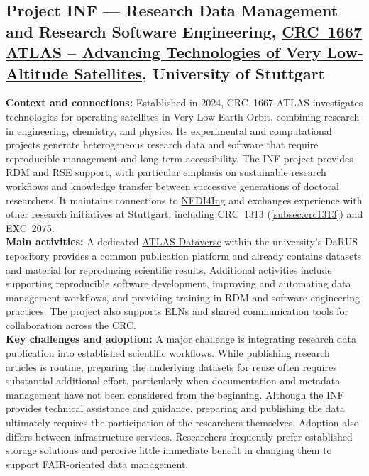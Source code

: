 \documentclass{eceasst}
\begin{document}
\subsection{Project INF --- Research Data Management and Research Software Engineering,
\href{https://gepris.dfg.de/gepris/projekt/516238647?language=en}
{CRC~1667 ATLAS -- Advancing Technologies of Very Low-Altitude Satellites}, University of Stuttgart}
\label{subsec:crc1667}
\noindent\textbf{Context and connections:}
Established in 2024, CRC~1667 ATLAS investigates
technologies for operating satellites in Very Low
Earth Orbit, combining research in engineering,
chemistry, and physics. Its experimental and
computational projects generate heterogeneous
research data and software that require reproducible
management and long-term accessibility.
The INF project provides RDM and RSE
support, with particular emphasis on sustainable
research workflows and knowledge transfer between
successive generations of doctoral researchers.
It maintains connections to \href{https://nfdi4ing.de/}{NFDI4Ing} and exchanges
experience with other research initiatives at
Stuttgart, including CRC~1313
(\autoref{subsec:crc1313}) and \href{https://www.simtech.uni-stuttgart.de/exc/}{EXC~2075}.
\\
\noindent\textbf{Main activities:}
A dedicated
\href{https://darus.uni-stuttgart.de/dataverse/sfb1667}
{ATLAS Dataverse} within the university's DaRUS
repository provides a common publication platform
and already contains datasets and material for
reproducing scientific results.
Additional activities include supporting reproducible
software development, improving and automating data
management workflows, and providing training in RDM
and software engineering practices. The project also
supports ELNs
and shared communication tools for collaboration
across the CRC.
\\
\noindent\textbf{Key challenges and adoption:}
A major challenge is integrating research data
publication into established scientific workflows.
While publishing research articles is routine,
preparing the underlying datasets for reuse often
requires substantial additional effort, particularly
when documentation and metadata management have not
been considered from the beginning. Although the INF
provides technical assistance and guidance, preparing
and publishing the data ultimately requires the
participation of the researchers themselves.
Adoption also differs between infrastructure
services.
Researchers frequently prefer established
storage solutions and perceive little immediate
benefit in changing them to support FAIR-oriented data management.
\end{document}
